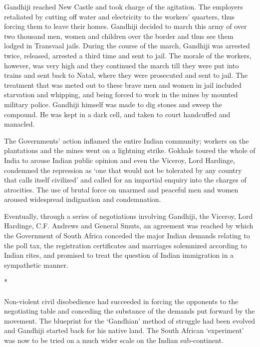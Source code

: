 \begin{multicols}{2}
Gandhiji reached New Castle and took charge of the agitation. The employers retaliated by cutting off water and electricity to the workers' quarters, thus forcing them to leave their homes. Gandhiji decided to march this army of over two thousand men, women and children over the border and thus see them lodged in Transvaal jails. During the course of the march, Gandhiji was arrested twice, released, arrested a third time and sent to jail. The morale of the workers, however, was very high and they continued the march till they were put into trains and sent back to Natal, where they were prosecuted and sent to jail. The treatment that was meted out to these brave men and women in jail included starvation and whipping, and being forced to work in the mines by mounted military police. Gandhiji himself was made to dig stones and sweep the compound. He was kept in a dark cell, and taken to court handcuffed and manacled.

The Governments' action inflamed the entire Indian community; workers on the plantations and the mines went on a lightning strike. Gokhale toured the whole of India to arouse Indian public opinion and even the Viceroy, Lord Hardinge, condemned the repression as `one that would not be tolerated by any country that calls itself civilized' and called for an impartial enquiry into the charges of atrocities. The use of brutal force on unarmed and peaceful men and women aroused widespread indignation and condemnation.

Eventually, through a series of negotiations involving Gandhiji, the Viceroy, Lord Hardinge, C.F. Andrews and General Smuts, an agreement was reached by which the Government of South Africa conceded the major Indian demands relating to the poll tax, the registration certificates and marriages solemnized according to Indian rites, and promised to treat the question of Indian immigration in a sympathetic manner.

\begin{center}*\end{center}

\paragraph*{}

Non-violent civil disobedience had succeeded in forcing the opponents to the negotiating table and conceding the substance of the demands put forward by the movement. The blueprint for the `Gandhian' method of struggle had been evolved and Gandhiji started back for his native land. The South African `experiment' was now to be tried on a much wider scale on the Indian sub-continent.


\end{multicols}
